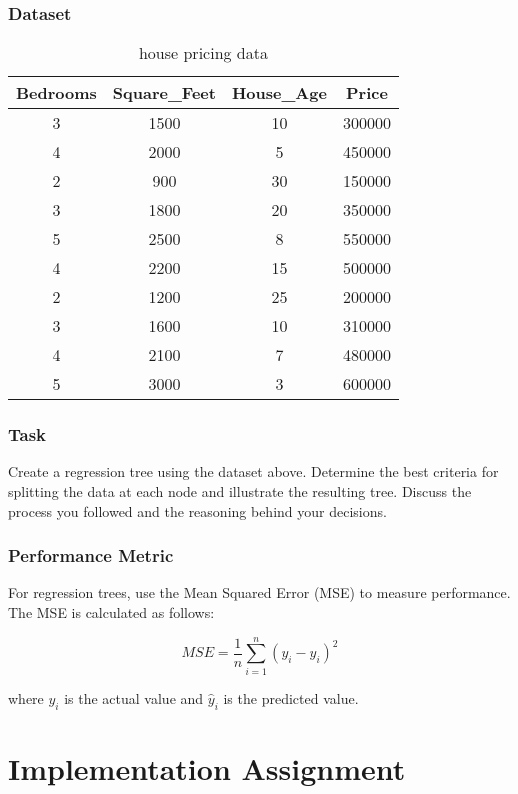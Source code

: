\documentclass{article}
\begin{document}
	\section*{Dataset}
	\begin{table}[h]
	\centering
	\begin{tabular}{cccc}
		\toprule
		Bedrooms & Square\_Feet & House\_Age & Price  \\
		\midrule
		3        & 1500        & 10        & 300000 \\
		4        & 2000        & 5         & 450000 \\
		2        & 900         & 30        & 150000 \\
		3        & 1800        & 20        & 350000 \\
		5        & 2500        & 8         & 550000 \\
		4        & 2200        & 15        & 500000 \\
		2        & 1200        & 25        & 200000 \\
		3        & 1600        & 10        & 310000 \\
		4        & 2100        & 7         & 480000 \\
		5        & 3000        & 3         & 600000 \\
		\bottomrule
	\end{tabular}
	\caption{house pricing data}
	\end{table}
	\section*{Task}
	Create a regression tree using the dataset above. Determine the best criteria for splitting the data at each node and illustrate the resulting tree. Discuss the process you followed and the reasoning behind your decisions.
	\section*{Performance Metric}
	For regression trees, use the Mean Squared Error (MSE) to measure performance. The MSE is calculated as follows:
	
	\[
	MSE = \frac{1}{n} \sum_{i=1}^{n} (y_i - \hat{y}_i)^2
	\]
	
	where \( y_i \) is the actual value and \( \hat{y}_i \) is the predicted value.
	
	\part{Implementation Assignment}
\end{document}
